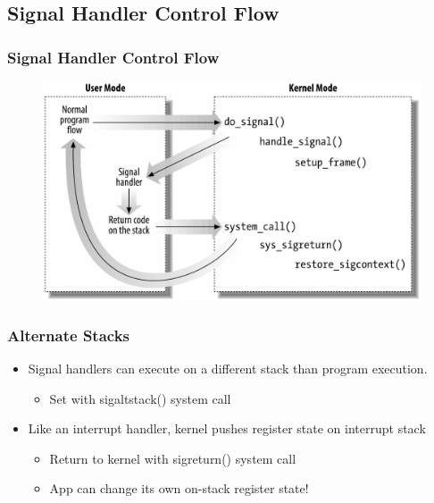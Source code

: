\subsection{Signal Handler Control Flow} %
\begin{frame}[fragile]
    \frametitle{Signal Handler Control Flow}
    \begin{figure}
	\includegraphics[width=0.8\linewidth]{figs/signal-control-flow.png}
	\end{figure}
\end{frame}
% 
% 
\begin{frame}[fragile]
    \frametitle{Alternate Stacks}
    \begin{itemize}
        \item Signal handlers can execute on a different stack than program execution.
        \begin{itemize}
            \item Set with sigaltstack() system call
        \end{itemize} \pause
        \item Like an interrupt handler, kernel pushes register state on interrupt stack
        \begin{itemize}
            \item Return to kernel with sigreturn() system call
            \item App can change its own on-stack register state!
        \end{itemize}
    \end{itemize}
\end{frame}
